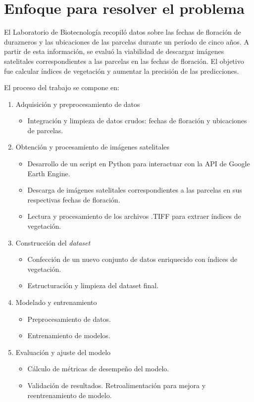 \section{Enfoque para resolver el problema}

El Laboratorio de Biotecnología recopiló datos sobre las fechas de floración de durazneros
y las ubicaciones de las parcelas durante un período de cinco años. A partir de esta información, 
se evaluó la viabilidad de descargar imágenes satelitales correspondientes a las parcelas en las 
fechas de floración. El objetivo fue calcular índices de vegetación y aumentar la precisión de las predicciones.

El proceso del trabajo se compone en: 

\begin{enumerate}
  \item Adquisición y preprocesamiento de datos
      \begin{itemize}
        \item Integración y limpieza de datos crudos: fechas de floración y ubicaciones de parcelas.
      \end{itemize}
  \item Obtención y procesamiento de imágenes satelitales
      \begin{itemize}
        \item Desarrollo de un script en Python para interactuar con la API de Google Earth Engine.
        \item Descarga de imágenes satelitales correspondientes a las parcelas en sus respectivas fechas de floración.
        \item Lectura y procesamiento de los archivos .TIFF para extraer índices de vegetación.
      \end{itemize}
  \item Construcción del \textit{dataset}
      \begin{itemize}
        \item Confección de un nuevo conjunto de datos enriquecido con índices de vegetación.
        \item Estructuración y limpieza del dataset final.
      \end{itemize}
  \item  Modelado y entrenamiento
      \begin{itemize}
        \item Preprocesamiento de datos.
        \item Entrenamiento de modelos.
      \end{itemize}
  \item Evaluación y ajuste del modelo
      \begin{itemize}
        \item Cálculo de métricas de desempeño del modelo.
        \item Validación de resultados. Retroalimentación para mejora y reentrenamiento de modelo.
      \end{itemize}
	\end{enumerate}

